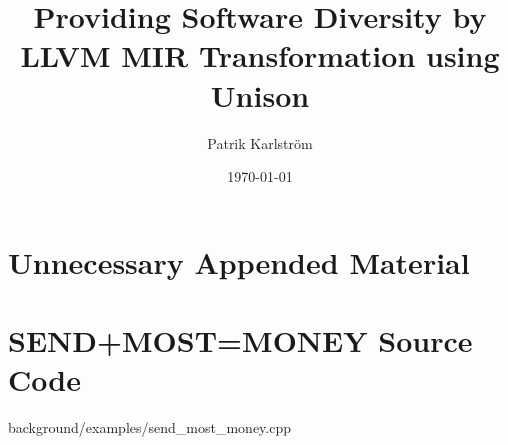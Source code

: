 \documentclass{kththesis}
\title{Providing Software Diversity by LLVM MIR Transformation using Unison}
\author{Patrik Karlström}
\date{\today}
\begin{document}
\frontmatter

\titlepage






\tableofcontents


\mainmatter







\printbibliography[heading=bibintoc] %

\appendix

\chapter{Unnecessary Appended Material}

\chapter{SEND+MOST=MONEY Source Code}
\label{appendix:constraint_programming}

	{background/examples/send_most_money.cpp}
\end{document}

